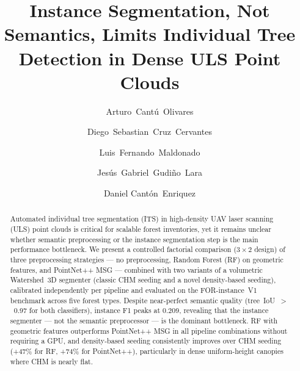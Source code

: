 \documentclass[runningheads]{llncs}
\begin{document}
\title{Instance Segmentation, Not Semantics, Limits Individual Tree Detection in Dense ULS Point Clouds}

\author{Arturo~Cant\'u~Olivares \and
Diego~Sebastian~Cruz~Cervantes \and
Luis~Fernando~Maldonado \and
Jes\'us~Gabriel~Gudi\~no~Lara \and
Daniel Cant\'on~Enriquez}



\maketitle

\begin{abstract}
Automated individual tree segmentation (ITS) in high-density UAV laser scanning (ULS) point clouds is critical for scalable forest inventories, yet it remains unclear whether semantic preprocessing or the instance segmentation step is the main performance bottleneck. We present a controlled factorial comparison ($3 \times 2$ design) of three preprocessing strategies --- no preprocessing, Random Forest (RF) on geometric features, and PointNet++ MSG --- combined with two variants of a volumetric Watershed~3D segmenter (classic CHM seeding and a novel density-based seeding), calibrated independently per pipeline and evaluated on the FOR-instance~V1 benchmark across five forest types. Despite near-perfect semantic quality (tree~IoU~$>$~0.97 for both classifiers), instance F1 peaks at 0.209, revealing that the instance segmenter --- not the semantic preprocessor --- is the dominant bottleneck. RF with geometric features outperforms PointNet++ MSG in all pipeline combinations without requiring a GPU, and density-based seeding consistently improves over CHM seeding (+47\% for RF, +74\% for PointNet++), particularly in dense uniform-height canopies where CHM is nearly flat.
\end{abstract}
\end{document}
